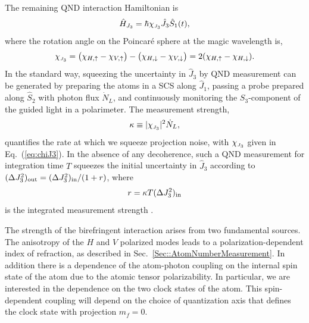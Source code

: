 \documentclass[preprint, aps,pra,onecolumn]{revtex4-1} %
\newcommand{\erf}[1]{Eq.~(\ref{#1})}
\newcommand{\inp}{{\rm in}}
\newcommand{\jx}{\hat{J}_1}
\newcommand{\jz}{\hat{J}_3}
\newcommand{\chieff}{\chi_{\raisebox{-.1pt}{\tiny $J_3$}}}
\begin{document}
The remaining QND interaction Hamiltonian is
	\begin{equation} \label{Eq::FaradayHam}
		\hat{H}_{J_3} = \hbar \chieff \jz \hat{S}_1(t),
	\end{equation}
where the rotation angle on the Poincar\'{e} sphere at the magic wavelength is,
\begin{equation}\label{eq:chiJ3}
\chieff = \big( \chi_{H, \uparrow} - \chi_{V,\uparrow} \big) - \big(\chi_{H,\downarrow} - \chi_{V,\downarrow} \big) = 2(\chi_{H, \uparrow}-\chi_{H, \downarrow}).
\end{equation}
In the standard way, squeezing the uncertainty in $\jz$ by QND measurement can be generated by preparing the atoms in a SCS along $\jx$, passing a probe prepared along $\hat{S}_2$ with photon flux $\dot{N}_L$, and continuously monitoring the $S_3$-component of the guided light in a polarimeter. The measurement strength,
	\begin{align} \label{Eq::MeasurementStrength}
		\kappa \equiv |\chieff|^2 \dot{N}_L, 
	\end{align}
quantifies the rate at which we squeeze projection noise, with $\chieff$ given in \erf{eq:chiJ3}. 
In the absence of any decoherence, such a QND measurement for integration time $T$ squeezes the initial uncertainty in $\jz$ according to $(\Delta J_3^2)_{\rm out}= (\Delta J_3^2)_{\rm in}/(1+r)$, where
	\begin{equation}
		r = \kappa T  (\Delta J_3^2)_{\inp}
	\end{equation}
is the integrated measurement strength \cite{hammerer_quantum_2010, baragiola_three-dimensional_2014}.

The strength of the birefringent interaction arises from two fundamental sources.  The anisotropy of the   $H$ and $V$ polarized modes leads to a polarization-dependent index of refraction, as described in Sec.~\ref{Sec::AtomNumberMeasurement}.  In addition there is a dependence of the atom-photon coupling on the internal spin state of the atom due to the atomic tensor polarizability.  In particular, we are interested in the dependence on the two clock states of the atom.  This spin-dependent coupling will depend on the choice of quantization axis that defines the clock state with projection $m_f=0$. 
\end{document}
